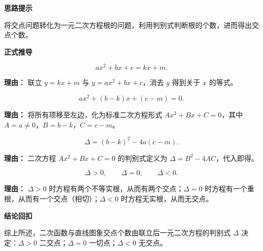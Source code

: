 \begin{proofbox}
	\textbf{\textcolor{CProof}{思路提示}}

	将交点问题转化为一元二次方程根的问题，利用判别式判断根的个数，进而得出交点个数。

	\medskip
	\textbf{\textcolor{CProof}{正式推导}}
	\begin{description}[style=nextline, leftmargin=2.8em, labelsep=0.5em, itemsep=0.55em]
		\item[\textbf{步骤一（代入消元）：}]
		      \[
			      ax^{2}+bx+c=kx+m.
		      \]
		      \par\textbf{理由：} 联立 $y=kx+m$ 与 $y=ax^{2}+bx+c$，消去 $y$ 得到关于 $x$ 的等式。

		\item[\textbf{步骤二（移项整理）：}]
		      \[
			      ax^{2}+(b-k)x+(c-m)=0.
		      \]
		      \par\textbf{理由：} 将所有项移至左边，化为标准二次方程形式 $Ax^{2}+Bx+C=0$，其中 $A=a\neq0$，$B=b-k$，$C=c-m$。

		\item[\textbf{步骤三（计算判别式）：}]
		      \[
			      \Delta=(b-k)^{2}-4a(c-m).
		      \]
		      \par\textbf{理由：} 二次方程 $Ax^{2}+Bx+C=0$ 的判别式定义为 $\Delta=B^{2}-4AC$，代入即得。

		\item[\textbf{步骤四（判别式分类）：}]
		      \[
			      \Delta>0,\qquad \Delta=0,\qquad \Delta<0.
		      \]
		      \par\textbf{理由：} $\Delta>0$ 时方程有两个不等实根，从而有两个交点；$\Delta=0$ 时方程有一个重根，从而有一个交点（相切）；$\Delta<0$ 时方程无实根，从而无交点。
	\end{description}

	\medskip
	\textbf{\textcolor{CProof}{结论回扣}}

	综上所述，二次函数与直线图象交点个数由联立后一元二次方程的判别式 $\Delta$ 决定：$\Delta>0$ 二交点；$\Delta=0$ 一切点；$\Delta<0$ 无交点。
\end{proofbox}